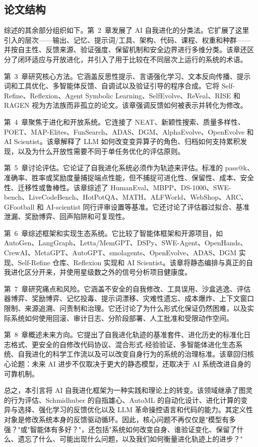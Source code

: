 \subsection{论文结构}
\label{subsec:intro-structure}

综述的其余部分组织如下。第~2~章发展了 AI 自我进化的分类法。它扩展了这里引入的层次——输出、记忆、提示词/工具、架构、代码、课程、权重和种群——并按自主性、反馈来源、验证强度、保留机制和安全边界进行多维分类。该章还区分了闭环适应与开放进化，并引入了用于比较在不同层次上运行的系统的术语。

第~3~章研究核心方法。它涵盖反思性提示、言语强化学习、文本反向传播、提示词和工具优化、多智能体反馈、自调试以及验证引导的程序合成。它将 Self-Refine、Reflexion、Agent Symbolic Learning、SelfEvolve、ReVeal、RISE 和 RAGEN 视为方法族而非孤立的论文。该章强调反馈如何被表示并转化为修改。

第~4~章聚焦于进化和开放系统。它连接了 NEAT、新颖性搜索、质量多样性、POET、MAP-Elites、FunSearch、ADAS、DGM、AlphaEvolve、OpenEvolve 和 AI Scientist。该章解释了 LLM 如何改变变异算子的角色、归档如何支持累积发现，以及为什么开放性需要不同于单任务优化的评估原则。

第~5~章讨论评估。它论证了自我进化系统必须作为轨迹来评估。标准的 pass@k、准确率、胜率或奖励度量捕捉端点性能，但不捕捉可进化性、保留性、成本、安全性、迁移性或鲁棒性。该章综述了 HumanEval、MBPP、DS-1000、SWE-bench、LiveCodeBench、HotPotQA、MATH、ALFWorld、WebShop、ARC、GFootball 和 AI-scientist 同行评审设置等基准。它还讨论了评估器过拟合、基准泄漏、奖励博弈、回声陷阱和可复现性。

第~6~章综述框架和实现生态系统。它比较了智能体框架和开源项目，如 AutoGen、LangGraph、Letta/MemGPT、DSPy、SWE-Agent、OpenHands、CrewAI、MetaGPT、AutoGPT、smolagents、OpenEvolve、ADAS、DGM 实现、Self-Refine 仓库、Reflexion 实现和 AI Scientist。该章将静态编排与真正的自我进化区分开来，并使用星级数之外的信号分析项目健康度。

第~7~章研究痛点和风险。它涵盖不安全的自我修改、工具误用、沙盒逃逸、评估器博弈、奖励博弈、记忆投毒、提示词漂移、灾难性遗忘、成本爆炸、上下文窗口限制、来源追溯、问责制和治理。它还讨论了为什么形式化保证仍然困难，以及实际系统如何使用回滚、审计日志、分阶段部署、人工批准和受限动作空间。

第~8~章概述未来方向。它提出了自我进化轨迹的基准套件、进化历史的标准化日志格式、更安全的自修改代码协议、混合形式-经验验证、多智能体进化生态系统、自我进化的科学工作流以及可以改变自身行为的系统的治理标准。该章回归核心论题：未来 AI 进步不仅取决于更大的静态模型，还取决于 AI 系统改进自身的可靠机制。

总之，本引言将 AI 自我进化框架为一种实践和理论上的转变。该领域继承了图灵的行为评估、Schmidhuber 的自指雄心、AutoML 的自动化设计、进化计算的变异与选择、强化学习的反馈优化以及 LLM 革命操控语言和代码的能力。其定义性对象是修改系统本身的反馈驱动循环。因此，核心问题不再仅仅是"模型有多强？"或"智能体有多好？"，还包括"系统如何改变自身、谁验证变化、保留了什么、遗忘了什么、可能出现什么问题，以及我们如何衡量进化轨迹上的进步？"
